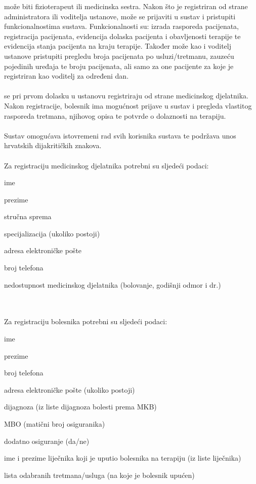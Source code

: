 		 može biti fizioterapeut ili medicinska sestra. Nakon što je registriran od strane administratora ili voditelja ustanove, može se prijaviti u sustav i pristupiti funkcionalnostima sustava. Funkcionalnosti su: izrada rasporeda pacijenata, registracija pacijenata, evidencija dolaska pacijenta i obavljenosti terapije te evidencija stanja pacijenta na kraju terapije. Također može kao i voditelj ustanove pristupiti pregledu broja pacijenata po usluzi/tretmanu, zauzeću pojedinih uređaja te broju pacijenata, ali samo za one pacijente za koje je registriran kao voditelj za određeni dan.\\\\
		 se pri prvom dolasku u ustanovu registriraju od strane medicinskog djelatnika. Nakon registracije, bolesnik ima mogućnost prijave u sustav i pregleda vlastitog rasporeda tretmana, njihovog opisa te potvrde o dolaznosti na terapiju.
		\\\\
		Sustav omogućava istovremeni rad svih korisnika sustava te podržava unos hrvatskih dijakritičkih znakova.
		\\\\
		Za registraciju medicinskog djelatnika potrebni su sljedeći podaci:
		\begin{packed_item}
			\item ime
			\item prezime
			\item stručna sprema
			\item specijalizacija (ukoliko postoji)
			\item adresa elektroničke pošte
			\item broj telefona
			\item nedostupnost medicinskog djelatnika (bolovanje, godišnji odmor i dr.)
		\end{packed_item}
		\\\\
		Za registraciju bolesnika potrebni su sljedeći podaci:
		\begin{packed_item}
			\item ime
			\item prezime
			\item broj telefona
			\item adresa elektroničke pošte (ukoliko postoji)
			\item dijagnoza (iz liste dijagnoza bolesti prema MKB)
			\item MBO (matični broj osiguranika)
			\item dodatno osiguranje (da/ne)
			\item ime i prezime liječnika koji je uputio bolesnika na terapiju (iz liste liječnika)
			\item lista odabranih tretmana/usluga (na koje je bolesnik upućen)
		\end{packed_item}
		
